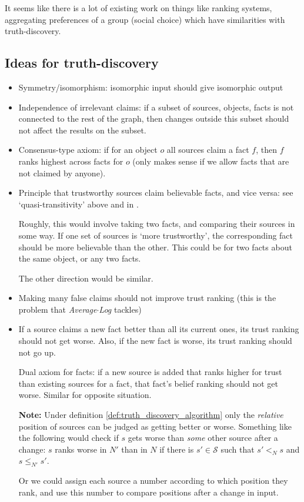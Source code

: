 \documentclass{article}
\theoremstyle{definition}
\theoremstyle{plain}
\theoremstyle{remark}
\renewcommand{\S}{\mathcal{S}}  %
\newcommand{\sle}{\le}
\begin{document}
It seems like there is a lot of existing work on things like ranking systems,
aggregating preferences of a group (social choice) which have similarities with
truth-discovery.

\subsection{Ideas for truth-discovery}
\begin{itemize}

\item Symmetry/isomorphism: isomorphic input should give isomorphic output

\item Independence of irrelevant claims: if a subset of sources, objects, facts
is not connected to the rest of the graph, then changes outside this subset
should not affect the results on the subset.

\item Consensus-type axiom: if for an object $o$ all sources claim a fact $f$,
then $f$ ranks highest across facts for $o$ (only makes sense if we allow facts
that are not claimed by anyone).

\item Principle that trustworthy sources claim believable facts, and vice
versa: see `quasi-transitivity' above and in \cite{altman_personalised}.

Roughly, this would involve taking two facts, and comparing their sources in
some way. If one set of sources is `more trustworthy', the corresponding fact
should be more believable than the other. This could be for two facts about the
same object, or any two facts.

The other direction would be similar.

\item Making many false claims should not improve trust ranking (this is the
problem that \emph{Average${\cdot}$Log} tackles)

\item If a source claims a new fact better than all its current ones, its trust
ranking should not get worse. Also, if the new fact is worse, its trust ranking
should not go up.

Dual axiom for facts: if a new source is added that ranks higher for trust than
existing sources for a fact, that fact's belief ranking should not get worse.
Similar for opposite situation.

\textbf{Note:} Under definition \ref{def:truth_discovery_algorithm} only the
\emph{relative} position of sources can be judged as getting better or worse.
Something like the following would check if $s$ gets worse than \emph{some}
other source after a change: $s$ ranks worse in $N'$ than in $N$ if there is
$s' \in \S$ such that $s' <_N s$ and $s \sle_{N'} s'$.

Or we could assign each source a number according to which position they rank,
and use this number to compare positions after a change in input.

\end{itemize}

{}


\end{document}
